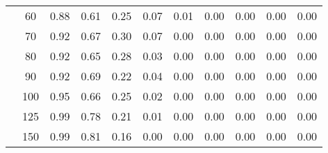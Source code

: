 \begin{table}[t]
\begin{center}
\begin{subtable}[c]{\textwidth}
\begin{center}
\begin{tabular}{rcccccccccc}
                                        & \multicolumn{1}{c|}{60}  & \num{0.88}  & \num{0.61}  & \num{0.25}  & \num{0.07}  & \num{0.01}  & \num{0.00}  & \num{0.00}  & \num{0.00}  & \num{0.00}  \\
                                        & \multicolumn{1}{c|}{70}  & \num{0.92}  & \num{0.67}  & \num{0.30}  & \num{0.07}  & \num{0.00}  & \num{0.00}  & \num{0.00}  & \num{0.00}  & \num{0.00}  \\
                                        & \multicolumn{1}{c|}{80}  & \num{0.92}  & \num{0.65}  & \num{0.28}  & \num{0.03}  & \num{0.00}  & \num{0.00}  & \num{0.00}  & \num{0.00}  & \num{0.00}  \\
                                        & \multicolumn{1}{c|}{90}  & \num{0.92}  & \num{0.69}  & \num{0.22}  & \num{0.04}  & \num{0.00}  & \num{0.00}  & \num{0.00}  & \num{0.00}  & \num{0.00}  \\
                                        & \multicolumn{1}{c|}{100}  & \num{0.95}  & \num{0.66}  & \num{0.25}  & \num{0.02}  & \num{0.00}  & \num{0.00}  & \num{0.00}  & \num{0.00}  & \num{0.00}  \\
                                        & \multicolumn{1}{c|}{125}  & \num{0.99}  & \num{0.78}  & \num{0.21}  & \num{0.01}  & \num{0.00}  & \num{0.00}  & \num{0.00}  & \num{0.00}  & \num{0.00}  \\
                                        & \multicolumn{1}{c|}{150}  & \num{0.99}  & \num{0.81}  & \num{0.16}  & \num{0.00}  & \num{0.00}  & \num{0.00}  & \num{0.00}  & \num{0.00}  & \num{0.00}  \\
                                    \end{tabular}
            \end{center}
        \end{subtable}

        \vspace{5mm}


\end{center}
\end{table}
